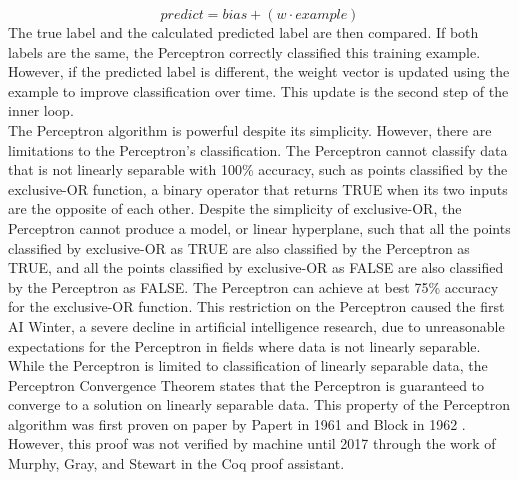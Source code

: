 \begin{equation}\label{perceptron_predict}
 predict = bias + (w \cdot example)
\end{equation}
The true label and the calculated predicted label are then compared. If both labels are the same, the Perceptron correctly classified this training example. However, if the predicted label is different, the weight vector is updated using the example to improve classification over time. This update is the second step of the inner loop.
\\The Perceptron algorithm is powerful despite its simplicity. However, there are limitations to the Perceptron's classification. The Perceptron cannot classify data that is not linearly separable with 100\% accuracy, such as points classified by the exclusive-OR function, a binary operator that returns TRUE when its two inputs are the opposite of each other. Despite the simplicity of exclusive-OR, the Perceptron cannot produce a model, or linear hyperplane, such that all the points classified by exclusive-OR as TRUE are also classified by the Perceptron as TRUE, and all the points classified by exclusive-OR as FALSE are also classified by the Perceptron as FALSE. The Perceptron can achieve at best 75\% accuracy for the exclusive-OR function. This restriction on the Perceptron caused the first AI Winter, a severe decline in artificial intelligence research, due to unreasonable expectations for the Perceptron in fields where data is not linearly separable.
\\While the Perceptron is limited to classification of linearly separable data, the Perceptron Convergence Theorem states that the Perceptron is guaranteed to converge to a solution on linearly separable data. This property of the Perceptron algorithm was first proven on paper by Papert in 1961 \cite{Pap61} and Block in 1962 \cite{Blo62}. However, this proof was not verified by machine until 2017 through the work of Murphy, Gray, and Stewart \cite{MGS17} in the Coq proof assistant. 
